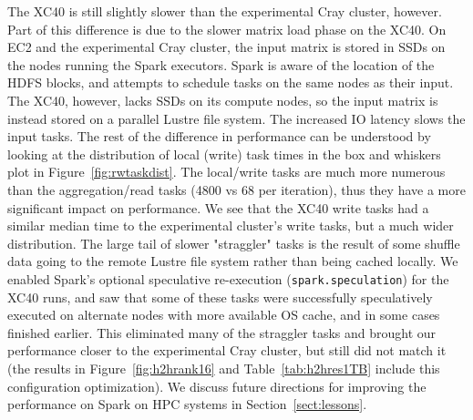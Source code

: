 The XC40 is still slightly slower than the experimental Cray cluster, however.
Part of this difference is due to the slower matrix load phase on the XC40.  On
EC2 and the experimental Cray cluster, the input matrix is stored in SSDs on
the nodes running the Spark executors.  Spark is aware of the location of the
HDFS blocks, and attempts to schedule tasks on the same nodes as their input.
The XC40, however, lacks SSDs on its compute nodes, so the input matrix is
instead stored on a parallel Lustre file system.  The increased IO latency
slows the input tasks. The rest of the difference in performance can be
understood by looking at the distribution of local (write) task times in the
box and whiskers plot in Figure~\ref{fig:rwtaskdist}.  The local/write tasks
are much more numerous than the aggregation/read tasks (4800 vs 68 per
iteration), thus they have a more significant impact on performance.  We see
that the XC40 write tasks had a similar median time to the experimental
cluster's write tasks, but a much wider distribution.  The large tail of slower
"straggler" tasks is the result of some shuffle data going to the remote Lustre
file system rather than being cached locally. We enabled Spark's optional
speculative re-execution (\texttt{spark.speculation}) for the XC40 runs, and
saw that some of these tasks were successfully speculatively executed on
alternate nodes with more available OS cache, and in some cases finished
earlier.  This eliminated many of the straggler tasks and brought our
performance closer to the experimental Cray cluster, but still did not match it
(the results in Figure~\ref{fig:h2hrank16} and Table~\ref{tab:h2hres1TB}
include this configuration optimization).  We discuss future directions for
improving the performance on Spark on HPC systems in
Section~\ref{sect:lessons}.
